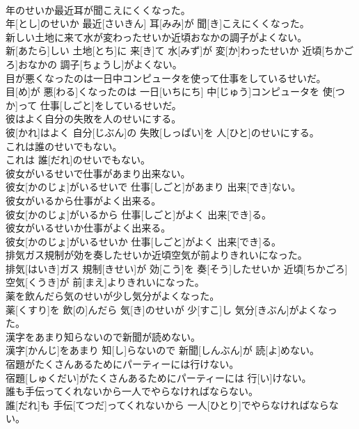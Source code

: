 \documentclass[8pt]{extreport}
\begin{document}
\begin{CJK}{UTF8}{min}
\\	年のせいか最近耳が聞こえにくくなった。	
\\	年[とし]のせいか 最近[さいきん] 耳[みみ]が 聞[き]こえにくくなった。
\\	新しい土地に来て水が変わったせいか近頃おなかの調子がよくない。	
\\	新[あたら]しい 土地[とち]に 来[き]て 水[みず]が 変[か]わったせいか 近頃[ちかごろ]おなかの 調子[ちょうし]がよくない。
\\	目が悪くなったのは一日中コンピュータを使って仕事をしているせいだ。	
\\	目[め]が 悪[わる]くなったのは 一日[いちにち] 中[じゅう]コンピュータを 使[つか]って 仕事[しごと]をしているせいだ。
\\	彼はよく自分の失敗を人のせいにする。	
\\	彼[かれ]はよく 自分[じぶん]の 失敗[しっぱい]を 人[ひと]のせいにする。
\\	これは誰のせいでもない。	
\\	これは 誰[だれ]のせいでもない。
\\	彼女がいるせいで仕事があまり出来ない。	
\\	彼女[かのじょ]がいるせいで 仕事[しごと]があまり 出来[でき]ない。
\\	彼女がいるから仕事がよく出来る。	
\\	彼女[かのじょ]がいるから 仕事[しごと]がよく 出来[でき]る。
\\	彼女がいるせいか仕事がよく出来る。	
\\	彼女[かのじょ]がいるせいか 仕事[しごと]がよく 出来[でき]る。
\\	排気ガス規制が効を奏したせいか近頃空気が前よりきれいになった。	
\\	排気[はいき]ガス 規制[きせい]が 効[こう]を 奏[そう]したせいか 近頃[ちかごろ] 空気[くうき]が 前[まえ]よりきれいになった。
\\	薬を飲んだら気のせいが少し気分がよくなった。	
\\	薬[くすり]を 飲[の]んだら 気[き]のせいが 少[すこ]し 気分[きぶん]がよくなった。
\\	漢字をあまり知らないので新聞が読めない。	
\\	漢字[かんじ]をあまり 知[し]らないので 新聞[しんぶん]が 読[よ]めない。
\\	宿題がたくさんあるためにパーティーには行けない。	
\\	宿題[しゅくだい]がたくさんあるためにパーティーには 行[い]けない。
\\	誰も手伝ってくれないから一人でやらなければならない。	
\\	誰[だれ]も 手伝[てつだ]ってくれないから 一人[ひとり]でやらなければならない。

\end{CJK}
\end{document}
